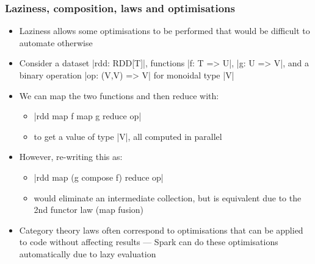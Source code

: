 \documentclass[mathserif,handout]{beamer}
\begin{document}
\begin{frame}[fragile]
  \frametitle{Laziness, composition, laws and optimisations}
  \begin{itemize}
    \item Laziness allows some optimisations to be performed that would be difficult to automate otherwise
    \item Consider a dataset |rdd: RDD[T]|, functions |f: T => U|, |g: U => V|, and a binary operation |op: (V,V) => V| for monoidal type |V|
    \item We can map the two functions and then reduce with:
      \begin{itemize}
      \item |rdd map f map g reduce op|
        \item to get a value of type |V|, all computed in parallel
      \end{itemize}
    \item However, re-writing this as:
      \begin{itemize}
      \item |rdd map (g compose f) reduce op|
        \item would eliminate an intermediate collection, but is equivalent due to the 2nd functor law (\alert{map fusion})
      \end{itemize}
      \item Category theory \alert{laws} often correspond to \alert{optimisations} that can be applied to code without affecting results --- Spark can do these optimisations \alert{automatically} due to lazy evaluation
  \end{itemize}
\end{frame}

\end{document}
